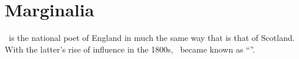 \documentclass[oneside]{article}
\begin{document}
%
%

\section{Marginalia}

\newif\ifSpecialFN
\newif\ifSpecialSN
\newif\ifRevertSN



\newcommand*\WM
{%
  \ifSpecialFN Wm.\else
  William\fi
}


\newcommand*\SHK
{%
  \ifRevertSN
    \textSC{Shakespeare}\else
    \ifSpecialSN
      \noexpand\AltCaps{t}he Bard\else
      \textSC{Shakespeare}%
    \fi
  \fi
}


\newcommand*\Revert{\RevertSNtrue}


\makeatletter
\renewcommand*\NamesFormat[1]
{%
  \RevertSNfalse\SpecialFNfalse\SpecialSNfalse%
  #1%
  \unless\ifinner
    \marginpar
    {%
      \footnotesize\raggedleft%
      \SpecialFNtrue\SpecialSNfalse%
      \NameParser%
    }%
  \fi
  \global\RevertSNfalse%
}

\renewcommand*\MainNameHook[1]
{%
  \AltOff\SpecialFNfalse\SpecialSNtrue%
  #1%
  \unless\ifinner
    \unless\ifRevertSN
      \marginpar
      {%
        \footnotesize\raggedleft%
        \SpecialFNfalse\SpecialSNfalse%
        \NameParser%
      }%
    \fi
  \fi
  \global\RevertSNfalse%
}
\makeatother

\ForgetThis\Shak\ is the national poet of England
in much the same way that 
is that of Scotland. With the latter's rise of influence
in the 1800s, \Revert\Shak\ became known as ``\Shak''.
\end{document}
